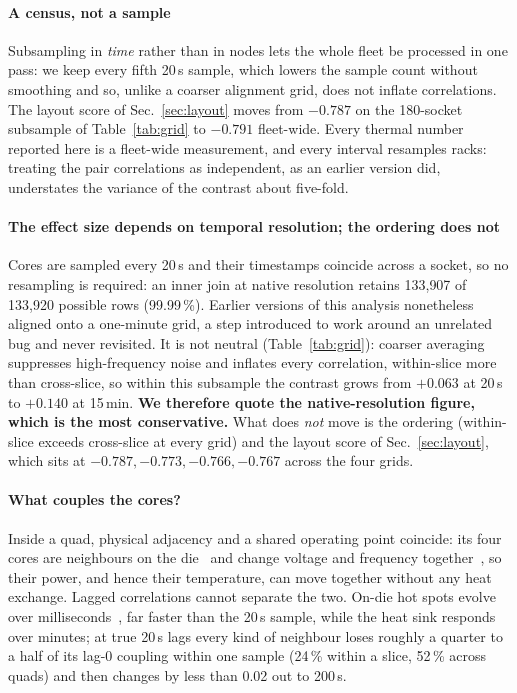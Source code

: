 \documentclass[10pt,conference]{IEEEtran}
\begin{document}
\paragraph*{A census, not a sample} Subsampling in \emph{time} rather than in nodes lets the whole
fleet be processed in one pass: we keep every fifth 20\,s sample, which lowers the sample count
without smoothing and so, unlike a coarser alignment grid, does not inflate correlations. The
layout score of Sec.~\ref{sec:layout} moves from $-0.787$ on the 180-socket subsample of
Table~\ref{tab:grid} to $-0.791$ fleet-wide. Every thermal number reported here is a fleet-wide
measurement, and every interval resamples racks: treating the pair correlations as independent, as
an earlier version did, understates the variance of the contrast about five-fold.

\paragraph*{The effect size depends on temporal resolution; the ordering does not}
\label{par:grid}
Cores are sampled every 20\,s and their timestamps coincide across a socket, so no resampling is
required: an inner join at native resolution retains 133{,}907 of 133{,}920 possible rows
(99.99\,\%). Earlier versions of this analysis nonetheless aligned onto a one-minute grid, a step
introduced to work around an unrelated bug and never revisited. It is not neutral
(Table~\ref{tab:grid}): coarser averaging suppresses high-frequency noise and inflates every
correlation, within-slice more than cross-slice, so within this subsample the contrast grows from
$+0.063$ at 20\,s to $+0.140$ at 15\,min. \textbf{We therefore quote the native-resolution figure, which is the most
conservative.} What does \emph{not} move is the ordering (within-slice exceeds cross-slice at
every grid) and the layout score of Sec.~\ref{sec:layout}, which sits at
$-0.787,-0.773,-0.766,-0.767$ across the four grids.

\paragraph*{What couples the cores?} Inside a quad, physical adjacency and a shared operating
point coincide: its four cores are neighbours on the die~\cite{ibm_p9regs} and change voltage and
frequency together~\cite{ibm_p9um}, so their power, and hence their temperature, can move together
without any heat exchange. Lagged correlations cannot separate the two. On-die hot spots evolve over
milliseconds~\cite{skadron2003hotspot}, far faster than the 20\,s sample, while the heat sink
responds over minutes; at true 20\,s lags every kind of neighbour loses roughly a quarter to a half of its
lag-0 coupling within one sample (24\,\% within a slice, 52\,\% across quads) and then changes by
less than 0.02 out to 200\,s.
\end{document}
